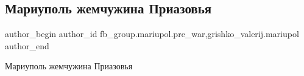  
 
 
 
 

\subsection{Мариуполь жемчужина Приазовья}
\label{sec:29_01_2023.fb.fb_group.mariupol.pre_war.1.mariupol_zhemchuzhin}
 
\ifcmt
 author_begin
   author_id fb_group.mariupol.pre_war,grishko_valerij.mariupol
 author_end
\fi

Мариуполь жемчужина Приазовья

